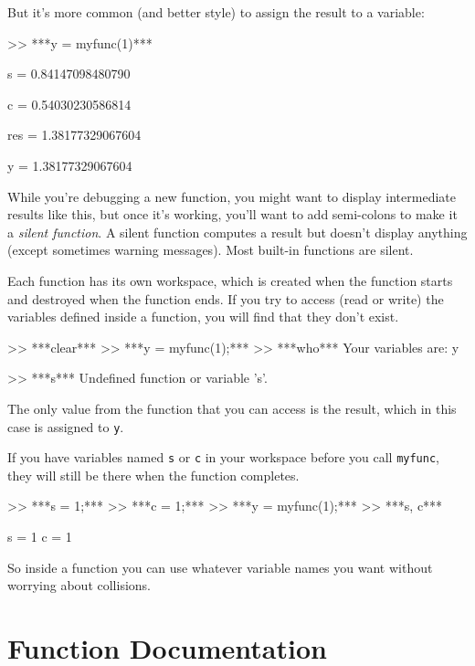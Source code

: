 But it's more common (and better style) to assign the result to
a variable:

\begin{code}
>> ***y = myfunc(1)***

s = 0.84147098480790

c = 0.54030230586814

res = 1.38177329067604

y = 1.38177329067604
\end{code}

While you're debugging a new function, you might want to display
intermediate results like this, but once it's working, you'll want
to add semi-colons to make it a {\em silent function}.  A silent function
computes a result but doesn't display
anything (except sometimes warning messages). Most built-in
functions are silent.


Each function has its own workspace, which is created when the
function starts and destroyed when the function ends.  If you try to
access (read or write) the variables defined inside a function, you
will find that they don't exist.

\begin{code}
>> ***clear***
>> ***y = myfunc(1);***
>> ***who***
Your variables are: y

>> ***s***
Undefined function or variable 's'.
\end{code}

The only value from the function that you can access is the result,
which in this case is assigned to {\tt y}.

If you have variables named {\tt s} or {\tt c} in your workspace
before you call {\tt myfunc}, they will still be there when the
function completes.

\begin{code}
>> ***s = 1;***
>> ***c = 1;***
>> ***y = myfunc(1);***
>> ***s, c***

s = 1
c = 1
\end{code}

So inside a function you can use whatever variable names you
want without worrying about collisions.



\section{Function Documentation}

